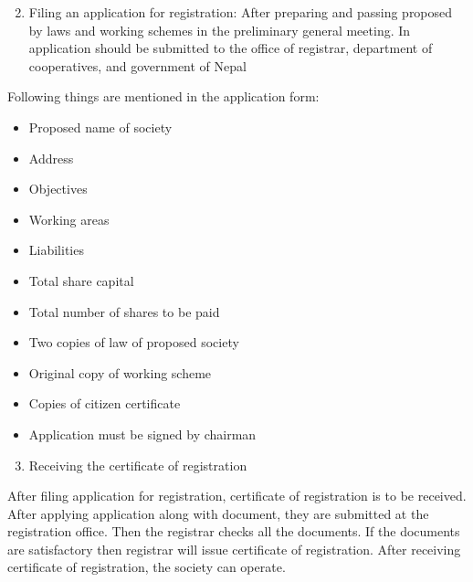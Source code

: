 \documentclass[12pt,ignorenonframetext,aspectratio=169]{beamer}
\providecommand{\tightlist}{%
  \setlength{\itemsep}{0pt}\setlength{\parskip}{0pt}}
\begin{document}
\begin{frame}{}
\protect\hypertarget{section-6}{}
\footnotesize

\begin{enumerate}
\setcounter{enumi}{1}
\tightlist
\item
  Filing an application for registration: After preparing and passing
  proposed by laws and working schemes in the preliminary general
  meeting. In application should be submitted to the office of
  registrar, department of cooperatives, and government of Nepal
\end{enumerate}

Following things are mentioned in the application form:

\begin{itemize}
\tightlist
\item
  Proposed name of society
\item
  Address
\item
  Objectives
\item
  Working areas
\item
  Liabilities
\item
  Total share capital
\item
  Total number of shares to be paid
\item
  Two copies of law of proposed society
\item
  Original copy of working scheme
\item
  Copies of citizen certificate
\item
  Application must be signed by chairman
\end{itemize}
\end{frame}

\begin{frame}{}
\protect\hypertarget{section-7}{}
\begin{enumerate}
\setcounter{enumi}{2}
\tightlist
\item
  Receiving the certificate of registration
\end{enumerate}

After filing application for registration, certificate of registration
is to be received. After applying application along with document, they
are submitted at the registration office. Then the registrar checks all
the documents. If the documents are satisfactory then registrar will
issue certificate of registration. After receiving certificate of
registration, the society can operate.
\end{frame}
\end{document}
